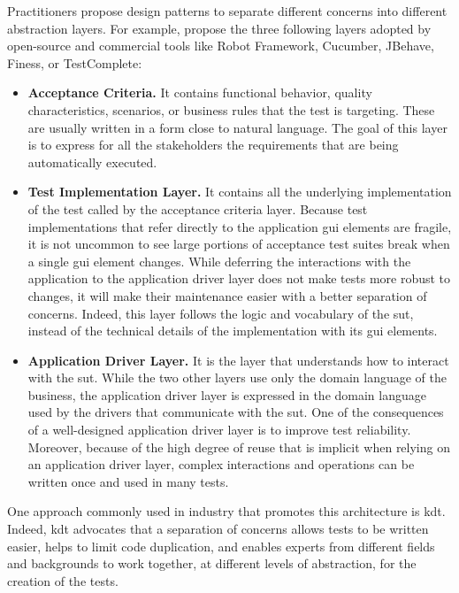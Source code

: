 Practitioners propose design patterns to separate different concerns into different abstraction layers. For example, \textcite{Humble2010} propose the three following layers adopted by open-source and commercial tools like Robot Framework, Cucumber, JBehave, Finess, or TestComplete:

\begin{itemize}
    \item \textbf{Acceptance Criteria.} It contains functional behavior, quality characteristics, scenarios, or business rules that the test is targeting. These are usually written in a form close to natural language. The goal of this layer is to express for all the stakeholders the requirements that are being automatically executed.
    
    \item \textbf{Test Implementation Layer.} It contains all the underlying implementation of the test called by the acceptance criteria layer. Because test implementations that refer directly to the application \gls{gui} elements are fragile, it is not uncommon to see large portions of acceptance test suites break when a single \gls{gui} element changes. While deferring the interactions with the application to the application driver layer does not make tests more robust to changes, it will make their maintenance easier with a better separation of concerns. Indeed, this layer follows the logic and vocabulary of the \gls{sut}, instead of the technical details of the implementation with its \gls{gui} elements.
    
    \item \textbf{Application Driver Layer.} It is the layer that understands how to interact with the \gls{sut}. While the two other layers use only the domain language of the business, the application driver layer is expressed in the domain language used by the drivers that communicate with the \gls{sut}. One of the consequences of a well-designed application driver layer is to improve test reliability. Moreover, because of the high degree of reuse that is implicit when relying on an application driver layer, complex interactions and operations can be written once and used in many tests.

\end{itemize}

One approach commonly used in industry that promotes this architecture is \gls{kdt}. Indeed, \gls{kdt} advocates that a separation of concerns allows tests to be written easier, helps to limit code duplication, and enables experts from different fields and backgrounds to work together, at different levels of abstraction, for the creation of the tests.

